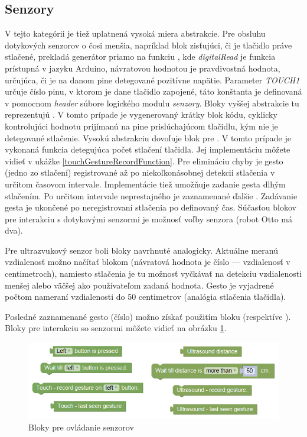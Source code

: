 \newpage

\subsection{Senzory}
V tejto kategórii je tiež uplatnená vysoká miera abstrakcie. Pre obsluhu dotykových senzorov o čosi menšia, napríklad blok zisťujúci, či je tlačidlo práve stlačené, prekladá generátor priamo na funkciu , kde \textit{digitalRead} je funkcia prístupná v jazyku Arduino, návratovou hodnotou je pravdivostná hodnota, určujúca, či je na danom pine detegované pozitívne napätie. Parameter \textit{TOUCH1} určuje číslo pinu, v ktorom je dane tlačidlo zapojené, táto konštanta je definovaná v pomocnom \textit{header} súbore logického modulu \textit{senzory}. Bloky vyššej abstrakcie tu reprezentujú . V tomto prípade je vygenerovaný krátky blok kódu, cyklicky kontrolujúci hodnotu prijímanú na pine prislúchajúcom tlačidlu, kým nie je detegované stlačenie. Vysokú abstrakciu dovoľuje blok pre . V tomto prípade je vykonaná funkcia detegujúca počet stlačení tlačidla. Jej implementáciu môžete vidieť v ukážke \ref{touchGestureRecordFunction}. Pre elimináciu chyby je gesto (jedno zo stlačení) registrované až po niekoľkonásobnej detekcii stlačenia v určitom časovom intervale. Implementácie tiež umožňuje zadanie gesta dlhým stlačením. Po určitom intervale neprestajného  je zaznamenané ďalšie . Zadávanie gesta je ukončené po neregistrovaní stlačenia po definovaný čas. Súčasťou blokov pre interakciu s dotykovými senzormi je možnosť voľby senzora (robot Otto má dva).

Pre ultrazvukový senzor boli bloky navrhnuté analogicky. Aktuálne meranú vzdialenosť možno načítať blokom  (návratová hodnota je číslo --- vzdialenosť v centimetroch), namiesto stlačenia je tu možnosť vyčkávať na detekciu vzdialenosti menšej alebo väčšej ako používateľom zadaná hodnota. Gesto je vyjadrené počtom nameraní vzdialenosti do 50 centimetrov (analógia stlačenia tlačidla).

Posledné zaznamenané gesto (číslo) možno získať použitím bloku  (respektíve ). Bloky pre interakciu so senzormi môžete vidieť na obrázku \ref{obr:sensor-blocks}.

\begin{figure}[bh!]
\centerline{\includegraphics[]{images/sensor-blocks}}
\caption[Bloky pre ovládanie senzorov]{Bloky pre ovládanie senzorov}
\label{obr:sensor-blocks}
\end{figure}


